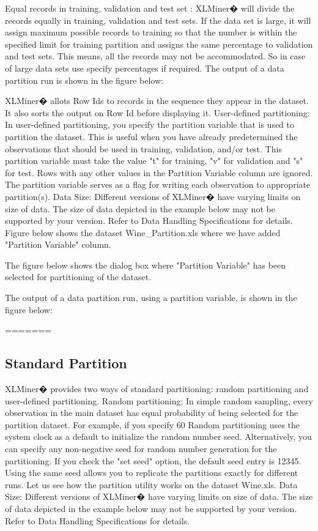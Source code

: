 Equal records in training, validation and test set : XLMiner�  will divide the records equally in training, validation and test sets. If the data set is large, it will assign maximum possible records to training so that the number is within the specified limit for training partition and assigns the same percentage to validation and test sets. This means, all the records may not be accommodated. So in case of large data sets use specify percentages if required.
 The output of a data partition run is shown in the figure below:

XLMiner� allots Row Ids to records in the sequence they appear in the dataset. It also sorts the output on Row Id before displaying it.
User-defined partitioning: In user-defined partitioning, you specify the partition variable that is used to partition the dataset. This is useful when you have already predetermined the observations that should be used in training, validation, and/or test. This partition variable must take the value "t" for training, "v" for validation and "s" for test. Rows with any other values in the Partition Variable column are ignored. The partition variable serves as a flag for writing each observation to appropriate partition(s).
Data Size: Different versions of XLMiner�  have varying limits on size of data. The size of data depicted in the example below may not be supported by your version. Refer to Data Handling Specifications for details.
Figure below shows the dataset Wine_Partition.xls where we have added "Partition Variable" column.

The figure below shows the dialog box where "Partition Variable" has been selected for partitioning of the dataset.
   
The output of a data partition run, using a partition variable, is shown in the figure below:

 
=======
\subsection{Standard Partition}
XLMiner� provides two ways of standard partitioning: random partitioning and user-defined partitioning.
Random partitioning: In simple random sampling, every observation in the main dataset has equal probability of being selected for the partition dataset. For example, if you specify 60%
Random partitioning uses the system clock as a default to initialize the random number seed. Alternatively, you can specify any non-negative seed for random number generation for the partitioning. If you check the "set seed" option, the default seed entry is 12345. 
Using the same seed allows you to replicate the partitions exactly for different runs. 
Let us see how the partition utility works on the dataset Wine.xls.
Data Size: Different versions of XLMiner�  have varying limits on size of data. The size of data depicted in the example below may not be supported by your version. Refer to Data Handling Specifications for details.


